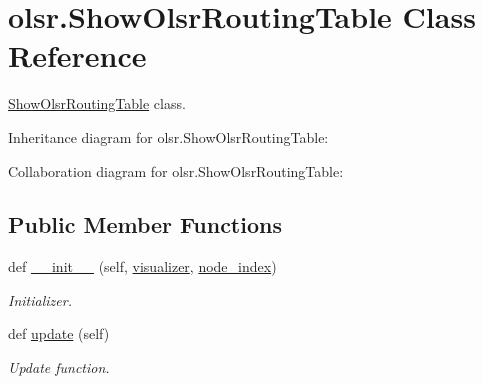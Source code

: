 \hypertarget{classolsr_1_1ShowOlsrRoutingTable}{}\section{olsr.\+Show\+Olsr\+Routing\+Table Class Reference}
\label{classolsr_1_1ShowOlsrRoutingTable}


\hyperlink{classolsr_1_1ShowOlsrRoutingTable}{Show\+Olsr\+Routing\+Table} class.  




Inheritance diagram for olsr.\+Show\+Olsr\+Routing\+Table\+:


Collaboration diagram for olsr.\+Show\+Olsr\+Routing\+Table\+:
\subsection*{Public Member Functions}
\begin{DoxyCompactItemize}
\item 
def \hyperlink{classolsr_1_1ShowOlsrRoutingTable_a1177b4090ab65836f8103aa5e87a325d}{\+\_\+\+\_\+init\+\_\+\+\_\+} (self, \hyperlink{classolsr_1_1ShowOlsrRoutingTable_a1ffe99444da97be6a1afe82990d6dd4e}{visualizer}, \hyperlink{classolsr_1_1ShowOlsrRoutingTable_a10f34aed8044599bc9c200ebbbe15dc1}{node\+\_\+index})
\begin{DoxyCompactList}\small\item\em Initializer. \end{DoxyCompactList}\item 
def \hyperlink{classolsr_1_1ShowOlsrRoutingTable_abc19f53930b613b2a11f1e6a3d50b9d4}{update} (self)
\begin{DoxyCompactList}\small\item\em Update function. \end{DoxyCompactList}\end{DoxyCompactItemize}

